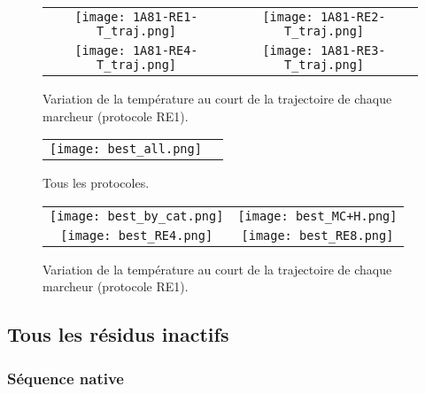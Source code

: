    \begin{figure}[t]
     \centering
     \begin{tabular}{cc}
       \texttt{[image: 1A81-RE1-T\_traj.png]} &
       \texttt{[image: 1A81-RE2-T\_traj.png]} \\
       \texttt{[image: 1A81-RE4-T\_traj.png]} &
       \texttt{[image: 1A81-RE3-T\_traj.png]} \\
     \end{tabular}
     \caption{Variation de la température au court de la trajectoire de chaque marcheur (protocole RE1).}
\label{graph:TRAJ_T}
   \end{figure}

    \clearpage

   \begin{figure}[t]
     \centering
     \begin{tabular}{cc}
       \texttt{[image: best\_all.png]} \\
     \end{tabular}
     \caption{Tous les protocoles.}
\label{graph:best_ener_all_all}
   \end{figure}


    \clearpage


   \begin{figure}[t]
     \centering
     \begin{tabular}{cc}
       \texttt{[image: best\_by\_cat.png]} &
       \texttt{[image: best\_MC+H.png]} \\
       \texttt{[image: best\_RE4.png]} &
       \texttt{[image: best\_RE8.png]} \\
     \end{tabular}
     \caption{Variation de la température au court de la trajectoire de chaque marcheur (protocole RE1).}
\label{graph:best_ener_by_algo}
   \end{figure}


    \clearpage

   \subsection{Tous les résidus inactifs}
 
   \subsubsection{Séquence native}

